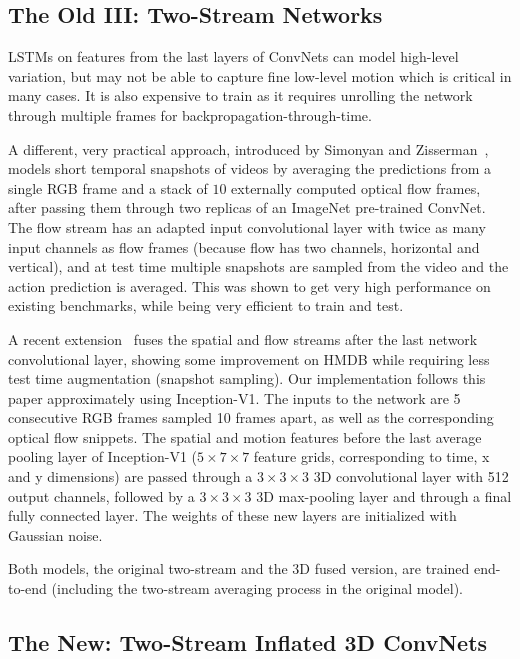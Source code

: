 \documentclass[10pt,twocolumn,letterpaper]{article}
\begin{document}
\subsection{The Old III: Two-Stream Networks}

LSTMs on features from the last layers of ConvNets can model high-level variation, but may not be able to capture fine low-level motion which is critical in many cases. It is also expensive to train as it requires unrolling the network through multiple frames for backpropagation-through-time. 

A different, very practical approach, introduced by Simonyan and Zisserman~\cite{simonyan2014two}, models short temporal snapshots of videos by averaging the predictions from a single RGB frame and a stack of $10$ externally computed optical flow frames, after passing them through two replicas of an ImageNet pre-trained ConvNet. The flow stream has an adapted input convolutional layer with twice as many input channels as flow frames (because flow has two channels, horizontal and vertical), and at test time multiple snapshots are sampled from the video and the action prediction is averaged. This was shown to get very high performance on existing benchmarks, while being very efficient to train and test.

A recent extension~\cite{feichtenhofer2016convolutional} fuses the
spatial and flow streams after the last network convolutional layer,
showing some improvement on HMDB while requiring less test time
augmentation (snapshot sampling). Our implementation follows this
paper approximately using Inception-V1. The inputs to the network are 5 consecutive RGB frames sampled 10 frames apart, as well as the
corresponding optical flow snippets.  The spatial and motion features
before the last average pooling layer of Inception-V1 ($5 \times 7 \times 7$ feature
grids, corresponding to time, x and y dimensions) are passed through a $3 \times 3 \times 3$ 3D convolutional layer with
512 output channels, followed by a $3 \times 3 \times 3$ 3D
max-pooling layer and through a final fully connected layer. The
weights of these new layers are initialized with Gaussian noise.

Both models, the original two-stream and the 3D fused version, are trained end-to-end (including the two-stream averaging process in the original model).


\subsection{The New: Two-Stream Inflated 3D ConvNets}
\end{document}
